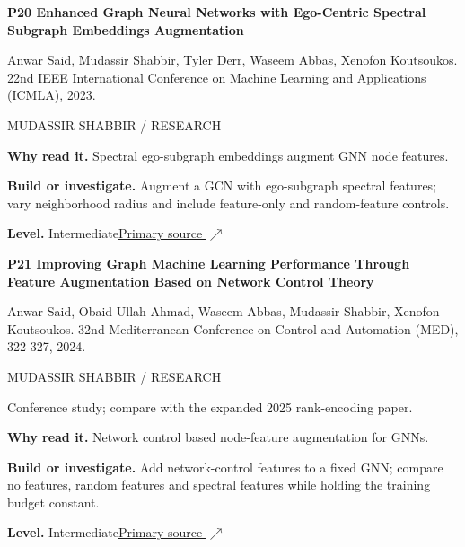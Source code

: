 \documentclass[11pt,letterpaper]{article}
\begin{document}
\begin{minipage}{\linewidth}
{\large\bfseries P20 Enhanced Graph Neural Networks with Ego-Centric Spectral Subgraph Embeddings Augmentation}\par
Anwar Said, Mudassir Shabbir, Tyler Derr, Waseem Abbas, Xenofon Koutsoukos. 22nd IEEE International Conference on Machine Learning and Applications (ICMLA), 2023.\par
\textcolor{ink}{\small MUDASSIR SHABBIR / RESEARCH}\par
\textbf{Why read it.} Spectral ego-subgraph embeddings augment GNN node features.\par
\textbf{Build or investigate.} Augment a GCN with ego-subgraph spectral features; vary neighborhood radius and include feature-only and random-feature controls.\par
\textbf{Level.} Intermediate\quad\href{https://doi.org/10.1109/ICMLA58977.2023.00341}{Primary source $\nearrow$}\par
\end{minipage}\par\vspace{10pt}
\begin{minipage}{\linewidth}
{\large\bfseries P21 Improving Graph Machine Learning Performance Through Feature Augmentation Based on Network Control Theory}\par
Anwar Said, Obaid Ullah Ahmad, Waseem Abbas, Mudassir Shabbir, Xenofon Koutsoukos. 32nd Mediterranean Conference on Control and Automation (MED), 322-327, 2024.\par
\textcolor{ink}{\small MUDASSIR SHABBIR / RESEARCH}\par
{\small Conference study; compare with the expanded 2025 rank-encoding paper.}\par
\textbf{Why read it.} Network control based node-feature augmentation for GNNs.\par
\textbf{Build or investigate.} Add network-control features to a fixed GNN; compare no features, random features and spectral features while holding the training budget constant.\par
\textbf{Level.} Intermediate\quad\href{https://doi.org/10.1109/MED61351.2024.10566241}{Primary source $\nearrow$}\par
\end{minipage}\par\vspace{10pt}
\end{document}
